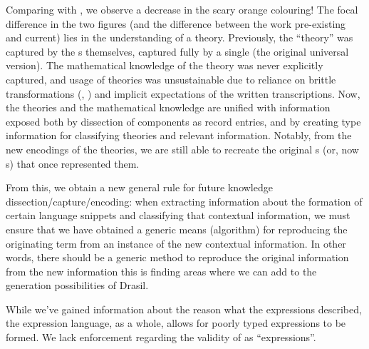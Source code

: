 Comparing  with , we
observe a decrease in the scary orange colouring! The focal difference in the
two figures (and the difference between the work pre-existing and current) lies
in the understanding of a theory. Previously, the ``theory'' was captured by the
\RelationConcept{}s themselves, captured fully by a single \Expr{} (the original
universal version). The mathematical knowledge of the theory was never
explicitly captured, and usage of theories was unsustainable due to reliance on
brittle transformations (\relToQD{}, ) and implicit
expectations of the written transcriptions. Now, the theories and the
mathematical knowledge are unified with information exposed both by dissection
of components as record entries, and by creating type information for
classifying theories and relevant information. Notably, from the new encodings
of the theories, we are still able to recreate the original \Expr{}s (or, now
\ModelExpr{}s) that once represented them.



From this, we obtain a new general rule for future knowledge
dissection/capture/encoding: when extracting information about the formation of
certain language snippets and classifying that contextual information, we must
ensure that we have obtained a generic means (algorithm) for reproducing the
originating term from an instance of the new contextual information. In other
words, there should be a generic method to reproduce the original information
from the new information \textemdash{} this is finding areas where we can add to the
generation possibilities of Drasil.

While we've gained information about the reason what the expressions described,
the expression language, as a whole, allows for poorly typed expressions to be
formed. We lack enforcement regarding the validity of \Expr{} as
``expressions''.

